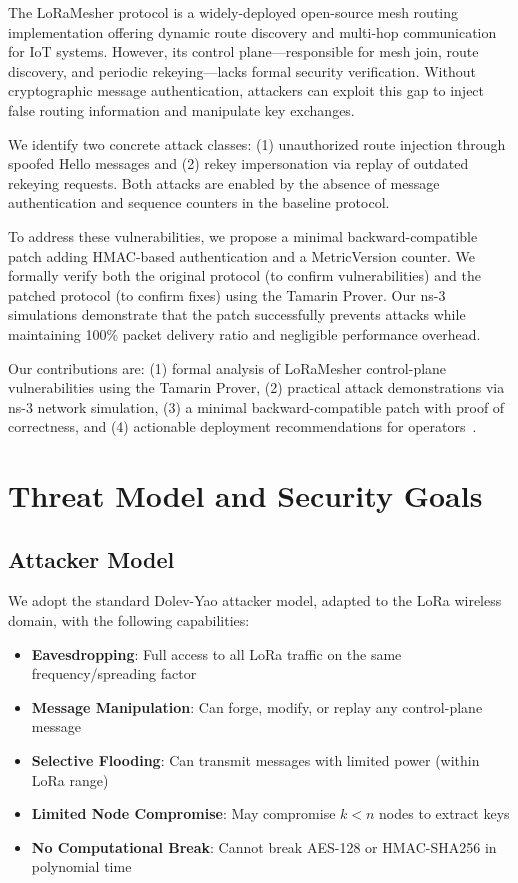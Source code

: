 \documentclass[10pt,journal]{IEEEtran}
\begin{document}
The LoRaMesher protocol is a widely-deployed open-source mesh routing implementation offering dynamic route discovery and multi-hop communication for IoT systems. However, its control plane—responsible for mesh join, route discovery, and periodic rekeying—lacks formal security verification. Without cryptographic message authentication, attackers can exploit this gap to inject false routing information and manipulate key exchanges.

We identify two concrete attack classes: (1) unauthorized route injection through spoofed Hello messages and (2) rekey impersonation via replay of outdated rekeying requests. Both attacks are enabled by the absence of message authentication and sequence counters in the baseline protocol.

To address these vulnerabilities, we propose a minimal backward-compatible patch adding HMAC-based authentication and a MetricVersion counter. We formally verify both the original protocol (to confirm vulnerabilities) and the patched protocol (to confirm fixes) using the Tamarin Prover. Our ns-3 simulations demonstrate that the patch successfully prevents attacks while maintaining 100\% packet delivery ratio and negligible performance overhead.

Our contributions are: (1) formal analysis of LoRaMesher control-plane vulnerabilities using the Tamarin Prover, (2) practical attack demonstrations via ns-3 network simulation, (3) a minimal backward-compatible patch with proof of correctness, and (4) actionable deployment recommendations for operators~\cite{ieee2025-lorawan-aes-crypto,springer2026-adr-mobility}.

\section{Threat Model and Security Goals}

\subsection{Attacker Model}

We adopt the standard Dolev-Yao attacker model, adapted to the LoRa wireless domain, with the following capabilities:

\begin{itemize}
	\item \textbf{Eavesdropping}: Full access to all LoRa traffic on the same frequency/spreading factor
	\item \textbf{Message Manipulation}: Can forge, modify, or replay any control-plane message
	\item \textbf{Selective Flooding}: Can transmit messages with limited power (within LoRa range)
	\item \textbf{Limited Node Compromise}: May compromise $k < n$ nodes to extract keys
	\item \textbf{No Computational Break}: Cannot break AES-128 or HMAC-SHA256 in polynomial time
\end{itemize}
\end{document}
